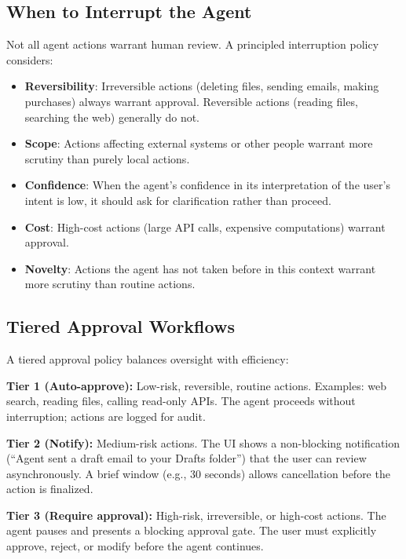 \subsection{When to Interrupt the Agent}
\label{when-to-interrupt-the-agent}

Not all agent actions warrant human review. A principled interruption policy considers:

\begin{itemize}
  \item \textbf{Reversibility}: Irreversible actions (deleting files, sending emails, making purchases) always warrant approval. Reversible actions (reading files, searching the web) generally do not.
  \item \textbf{Scope}: Actions affecting external systems or other people warrant more scrutiny than purely local actions.
  \item \textbf{Confidence}: When the agent’s confidence in its interpretation of the user’s intent is low, it should ask for clarification rather than proceed.
  \item \textbf{Cost}: High-cost actions (large API calls, expensive computations) warrant approval.
  \item \textbf{Novelty}: Actions the agent has not taken before in this context warrant more scrutiny than routine actions.
\end{itemize}

\subsection{Tiered Approval Workflows}
\label{tiered-approval-workflows}

A tiered approval policy balances oversight with efficiency:

\begin{keybox}
\textbf{Tier 1 (Auto-approve):} Low-risk, reversible, routine actions. Examples: web search, reading files, calling read-only APIs. The agent proceeds without interruption; actions are logged for audit.

\textbf{Tier 2 (Notify):} Medium-risk actions. The UI shows a non-blocking notification (``Agent sent a draft email to your Drafts folder'') that the user can review asynchronously. A brief window (e.g., 30 seconds) allows cancellation before the action is finalized.

\textbf{Tier 3 (Require approval):} High-risk, irreversible, or high-cost actions. The agent pauses and presents a blocking approval gate. The user must explicitly approve, reject, or modify before the agent continues.
\end{keybox}

